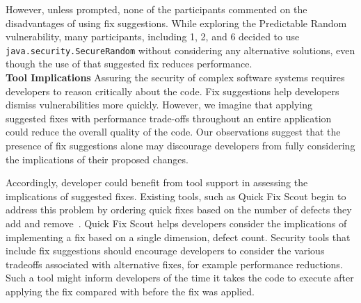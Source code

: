 \documentclass[conference]{IEEEtran}
\begin{document}
However, unless prompted, none of the participants commented on the disadvantages of using fix suggestions.
While exploring the Predictable Random vulnerability, many participants, including 1, 2, and 6 decided to use \texttt{java.security.SecureRandom} without considering any alternative solutions, even though the use of that suggested fix reduces performance.
\\


\noindent\textbf{Tool Implications}
Assuring the security of complex software systems requires developers to reason critically about the code. 
Fix suggestions help developers dismiss vulnerabilities more quickly.
However, we imagine that applying suggested fixes with performance trade-offs throughout an entire application could reduce the overall quality of the code.
Our observations suggest that the presence of fix suggestions alone may discourage developers from fully considering the implications of their proposed changes.

Accordingly, developer could benefit from tool support in assessing the implications of suggested fixes.
Existing tools, such as Quick Fix Scout begin to address this problem by ordering quick fixes based on the number of defects they add and remove~\cite{mucslu2012speculative}.
Quick Fix Scout helps developers consider the implications of implementing a fix based on a single dimension, defect count.
Security tools that include fix suggestions should encourage developers to consider the various tradeoffs associated with alternative fixes, for example performance reductions.
Such a tool might inform developers of the time it takes the code to execute after applying the fix compared with before the fix was applied.
\end{document}
